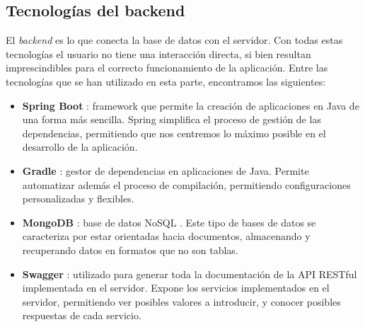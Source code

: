 \subsection{Tecnologías del backend}

El {\it backend} es lo que conecta la base de datos con el servidor. Con todas estas tecnologías el usuario no tiene una interacción directa, si bien resultan imprescindibles para el correcto funcionamiento de la aplicación. Entre las tecnologías que se han utilizado en esta parte, encontramos las siguientes:

\begin{itemize}
    \item {\bf Spring Boot} \cite{spring}: framework que permite la creación de aplicaciones en Java de una forma más sencilla. Spring simplifica el proceso de gestión de las dependencias, permitiendo que nos centremos lo máximo posible en el desarrollo de la aplicación.
    \item {\bf Gradle} \cite{gradle}: gestor de dependencias en aplicaciones de Java. Permite automatizar además el proceso de compilación, permitiendo configuraciones personalizadas y flexibles.
    \item {\bf MongoDB} \cite{mongodb}: base de datos NoSQL \cite{nosql}. Este tipo de bases de datos se caracteriza por estar orientadas hacia documentos, almacenando y recuperando datos en formatos que no son tablas.
    \item {\bf Swagger} \cite{swagger}: utilizado para generar toda la documentación de la API RESTful implementada en el servidor. Expone los servicios implementados en el servidor, permitiendo ver posibles valores a introducir, y conocer posibles respuestas de cada servicio.
\end{itemize}
